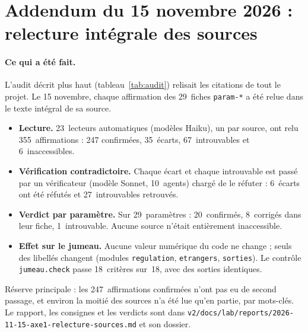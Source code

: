 \documentclass[11pt]{article}
\begin{document}
\section{Addendum du 15 novembre 2026 : relecture intégrale des sources}\label{sec:addendum}

\paragraph{Ce qui a été fait.}
L'audit décrit plus haut (tableau~\ref{tab:audit}) relisait les citations
de tout le projet. Le 15 novembre, chaque affirmation des 29~fiches
\texttt{param-*} a été relue dans le texte intégral de sa source.
\begin{itemize}
\item \textbf{Lecture.} 23\mesure{}~lecteurs automatiques (modèles Haiku),
  un par source, ont relu 355\mesure{}~affirmations : 247\mesure{}
  confirmées, 35\mesure{}~écarts, 67\mesure{}~introuvables et
  6\mesure{}~inaccessibles.
\item \textbf{Vérification contradictoire.} Chaque écart et chaque
  introuvable est passé par un vérificateur (modèle Sonnet,
  10\mesure{}~agents) chargé de le réfuter : 6\mesure{}~écarts ont été
  réfutés et 27\mesure{}~introuvables retrouvés.
\item \textbf{Verdict par paramètre.} Sur 29\mesure{}~paramètres :
  20\mesure{}~confirmés, 8\mesure{}~corrigés dans leur fiche,
  1\mesure{}~introuvable. Aucune source n'était entièrement
  inaccessible.
\item \textbf{Effet sur le jumeau.} Aucune valeur numérique du code ne
  change ; seuls des libellés changent (modules \texttt{regulation},
  \texttt{etrangers}, \texttt{sorties}). Le contrôle \texttt{jumeau.check}
  passe 18\mesure{}~critères sur~18, avec des sorties identiques.
\end{itemize}
Réserve principale : les 247~affirmations confirmées n'ont pas eu de second
passage, et environ la moitié\mesure{} des sources n'a été lue qu'en
partie, par mots-clés. Le rapport, les consignes et les verdicts sont dans
\texttt{v2/docs/lab/reports/2026-11-15-axe1-relecture-sources.md} et son
dossier.
\end{document}
